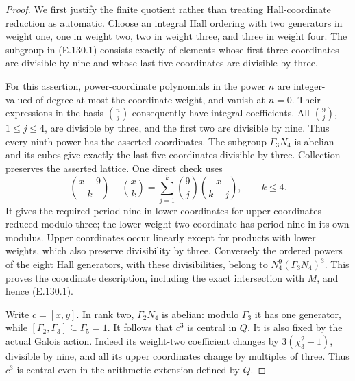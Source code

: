 \begin{proof}
We first justify the finite quotient rather than treating
Hall-coordinate reduction as automatic. Choose an integral
Hall ordering with two generators in weight one, one in
weight two, two in weight three, and three in weight four.
The subgroup in (E.130.1) consists exactly of elements
whose first three coordinates are divisible by nine and
whose last five coordinates are divisible by three.

For this assertion, power-coordinate polynomials in the
power \(n\) are integer-valued of degree at most the
coordinate weight, and vanish at \(n=0\). Their expressions
in the basis \(\binom nj\) consequently have integral
coefficients. All \(\binom9j\), \(1\leq j\leq4\), are
divisible by three, and the first two are divisible by
nine. Thus every ninth power has the asserted coordinates.
The subgroup \(\Gamma_3N_4\) is abelian and its cubes give
exactly the last five coordinates divisible by three.
Collection preserves the asserted lattice. One direct
check uses
\[
 \binom{x+9}{k}-\binom{x}{k}
       =\sum_{j=1}^k\binom9j\binom{x}{k-j},
       \qquad k\leq4.
\]
It gives the required period nine in lower coordinates
for upper coordinates reduced modulo three; the lower
weight-two coordinate has period nine in its own
modulus. Upper coordinates occur linearly except for
products with lower weights, which also preserve
divisibility by three. Conversely the ordered powers of
the eight Hall generators, with these divisibilities,
belong to \(N_4^9(\Gamma_3N_4)^3\). This proves the
coordinate description, including the exact intersection
with \(M\), and hence (E.130.1).

Write \(c=[x,y]\). In rank two,
\(\Gamma_2N_4\) is abelian: modulo \(\Gamma_3\) it has
one generator, while
\([\Gamma_2,\Gamma_3]\subseteq\Gamma_5=1\).
It follows that \(c^3\) is central in \(Q\). It is also
fixed by the actual Galois action. Indeed its
weight-two coefficient changes by
\(3(\chi_3^2-1)\), divisible by nine, and all its upper
coordinates change by multiples of three.
Thus \(c^3\) is central even in the arithmetic extension
defined by \(Q\).


\end{proof}
